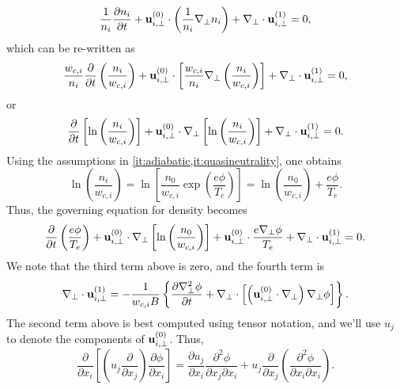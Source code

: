 \documentclass[oneside,a4paper,11pt]{report}
\begin{document}
\begin{equation}
    \frac{1}{n_i} \frac{\partial n_i }{\partial t} + \mathbf{u}_{i,\perp}^{(0)} \cdot \left( \frac{1}{n_i} \nabla_\perp n_i \right) + \nabla_\perp \cdot \mathbf{u}_{i,\perp}^{(1)} = 0,
\end{equation}
which can be re-written as
\begin{equation}
    \frac{w_{c,i}}{n_i} \frac{\partial }{\partial t} \left ( \frac{n_i}{w_{c,i}} \right) + \mathbf{u}_{i,\perp}^{(0)} \cdot \left[ \frac{w_{c,i}}{n_i} \nabla_\perp \left ( \frac{n_i}{w_{c,i}} \right ) \right] + \nabla_\perp \cdot \mathbf{u}_{i,\perp}^{(1)} = 0,
\end{equation}
or
\begin{equation}
    \frac{\partial }{\partial t} \left [ \ln \left( \frac{n_i}{w_{c,i}} \right) \right ] + \mathbf{u}_{i,\perp}^{(0)} \cdot \nabla_\perp \left [ \ln \left( \frac{n_i}{w_{c,i}} \right) \right ] + \nabla_\perp \cdot \mathbf{u}_{i,\perp}^{(1)} = 0.
\end{equation}
Using the assumptions in \cref{it:adiabatic,it:quasineutrality}, one obtains
\begin{equation}
    \ln \left( \frac{n_i}{w_{c,i}} \right) = \ln \left [ \frac{n_0}{w_{c,i}} \exp \left ( \frac{e \phi}{T_e} \right ) \right ] = \ln \left ( \frac{n_0}{w_{c,i}} \right ) + \frac{e \phi}{T_e}.
\end{equation}
Thus, the governing equation for density becomes
\begin{equation}
\label{eq:intermediate_hm_1}
    \frac{\partial}{\partial t} \left ( \frac{e \phi}{T_e} \right ) + \mathbf{u}_{i,\perp}^{(0)} \cdot \nabla_\perp \left [ \ln \left( \frac{n_0}{w_{c,i}} \right) \right ] + \mathbf{u}_{i,\perp}^{(0)} \cdot \frac{e \nabla_\perp \phi}{T_e} + \nabla_\perp \cdot \mathbf{u}_{i,\perp}^{(1)} = 0.
\end{equation}
We note that the third term above is zero, and the fourth term is
\begin{equation}
    \nabla_\perp \cdot \mathbf{u}_{i,\perp}^{(1)} = -\frac{1}{w_{c,i} B} \left \{ \frac{\partial \nabla_\perp^2 \phi}{\partial t} + \nabla_\perp \cdot \left [ \left ( \mathbf{u}_{i,\perp}^{(0)} \cdot \nabla_\perp \right ) \nabla_\perp \phi \right ] \right \}.
\end{equation}
The second term above is best computed using tensor notation, and we'll use $u_j$ to denote the components of $\mathbf{u}_{i,\perp}^{(0)}$. Thus,
\begin{equation}
    \frac{\partial}{\partial x_i} \left [ \left ( u_j \frac{\partial}{\partial x_j} \right) \frac{\partial \phi}{\partial x_i} \right ] = \frac{\partial u_j}{\partial x_i} \frac{\partial^2 \phi}{\partial x_j \partial x_i} + u_j \frac{\partial}{\partial x_j} \left (\frac{\partial^2 \phi}{\partial x_i \partial x_i} \right ).
\end{equation}
\end{document}
